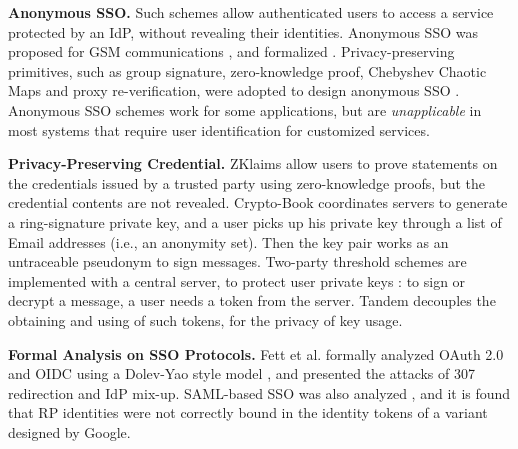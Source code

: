\noindent\textbf{Anonymous SSO.}
Such schemes allow authenticated users to access a service protected by an IdP,
    without revealing their identities.
Anonymous SSO was proposed for GSM communications \cite{ElmuftiWRR08},
    and formalized \cite{WangWS13}.
Privacy-preserving primitives, such as group signature, zero-knowledge proof, Chebyshev Chaotic Maps and proxy re-verification,
     were adopted to design anonymous SSO \cite{WangWS13,HanCSTW18,Lee18,HanCSTWW20}.
Anonymous SSO schemes work for some applications,
    but are \emph{unapplicable} in most systems that require user identification for customized services.

\noindent\textbf{Privacy-Preserving Credential.}
ZKlaims \cite{zklaim} allow users to prove statements on the credentials issued by a trusted party
    using zero-knowledge proofs,
        but the credential contents are not revealed.
Crypto-Book \cite{crypto-book} coordinates servers to generate a ring-signature private key,
 and a user picks up his private key through a list of Email addresses (i.e., an anonymity set).
 Then the key pair works as an untraceable pseudonym to sign messages.
Two-party threshold schemes are implemented with a central server,
    to protect user private keys \cite{mRSA,ss-rsa}:
    to sign or decrypt a message, a user needs a token from the server.
    Tandem \cite{tandem} decouples the obtaining and using of such tokens,
for the privacy of key usage.


\noindent\textbf{Formal Analysis on SSO Protocols.}
Fett et al. \cite{FettKS16, FettKS17} formally analyzed OAuth 2.0 and OIDC using a Dolev-Yao style model \cite{FettKS14},
    and presented the attacks of 307 redirection and IdP mix-up.
SAML-based SSO was also analyzed \cite{ArmandoCCCT08},
    and it is found that RP identities were not correctly bound in the identity tokens of a variant designed by Google.



